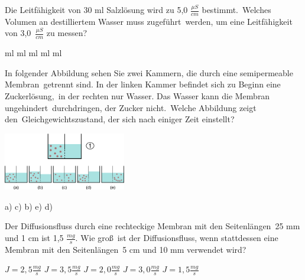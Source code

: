 \documentclass[11pt]{exam}
\begin{document}
\setlength{\voffset}{-0.5in}
\setlength{\headsep}{5pt}

\hspace{2mm}
 \hspace{5mm}
\vspace{4mm}

\begin{questions}

\question Die Leitfähigkeit von 30 ml Salzlösung wird zu 5,0 \( \frac{\mu S}{cm} \) bestimmt. Welches Volumen an destilliertem Wasser muss zugeführt werden, um eine Leitfähigkeit von 3,0 \( \frac{\mu S}{cm} \) zu messen?

\begin{choices}
	 ml
	 ml
	 ml
	 ml
	 ml
\end{choices}

\vspace{3mm}\question In folgender Abbildung sehen Sie zwei Kammern, die durch eine semipermeable Membran getrennt sind. In der linken Kammer befindet sich zu Beginn eine Zuckerlösung, in der rechten nur Wasser. Das Wasser kann die Membran ungehindert durchdringen, der Zucker nicht. Welche Abbildung zeigt den Gleichgewichtszustand, der sich nach einiger Zeit einstellt? 

\includegraphics[width=0.4\textwidth]{images/Osmose.png}

\begin{choices}
	\choice a)
	\choice c)
	\choice b)
	\choice e)
	\choice d)
\end{choices}

\vspace{3mm}\question Der Diffusionsfluss durch eine rechteckige Membran mit den Seitenlängen 25 mm und 1 cm ist 1,5 \(\frac{mg}{s} \). Wie groß ist der Diffusionsfluss, wenn stattdessen eine Membran mit den Seitenlängen 5 cm und 10 mm verwendet wird?

\begin{choices}
	\choice \( J = 2,5 \frac{mg}{s} \)
	\choice \( J = 3,5 \frac{mg}{s} \)
	\choice \( J = 2,0 \frac{mg}{s} \)
	\choice \( J = 3,0 \frac{mg}{s} \)
	\choice \( J = 1,5 \frac{mg}{s} \)
\end{choices}


\end{questions}
\end{document}
